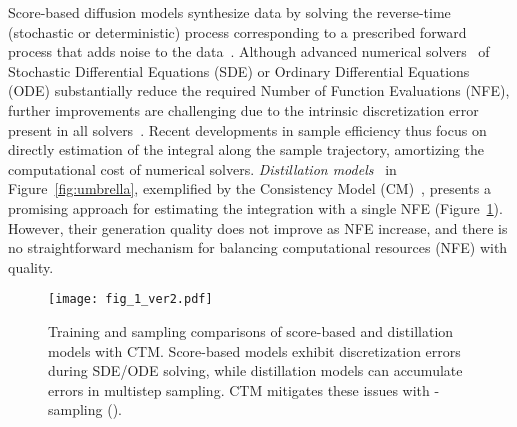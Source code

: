 \documentclass{article} \usepackage{iclr2024_coNFErence,times}
\theoremstyle{definition}
\theoremstyle{remark}
\begin{document}
Score-based diffusion models synthesize data by solving the reverse-time (stochastic or deterministic) process corresponding to a prescribed forward process that adds noise to the data~\citep{song2019generative,song2020score}. Although advanced numerical  solvers~\citep{lu2022dpm, zhang2022fast} of Stochastic Differential Equations (SDE) or Ordinary Differential Equations (ODE) substantially reduce the required Number of Function Evaluations (NFE), 
further improvements are challenging 
due to the intrinsic discretization error present in all solvers~\citep{de2021diffusion}. Recent developments in sample efficiency thus focus on directly  estimation of the integral along the sample trajectory, amortizing the computational cost of numerical solvers.
\emph{Distillation models}~\citep{salimans2021progressive} in Figure~\ref{fig:umbrella}, exemplified by the Consistency Model (CM)~\citep{song2023consistency}, presents a promising approach for estimating the integration with a single NFE (Figure~\ref{fig:i_am_fig_1}). 
However, their generation quality does not improve as NFE increase, and there is no straightforward mechanism for balancing computational resources (NFE) with quality.

\begin{figure}[t]
 \vskip -0.05in
    \centering
    \texttt{[image: fig\_1\_ver2.pdf]}
    \caption{Training and sampling comparisons of score-based and distillation models with CTM. Score-based models exhibit discretization errors during SDE/ODE solving, while distillation models can accumulate errors in multistep sampling. CTM mitigates these issues with -sampling ().}
    \label{fig:i_am_fig_1}
    \vskip -0.1in
\end{figure}
\end{document}
